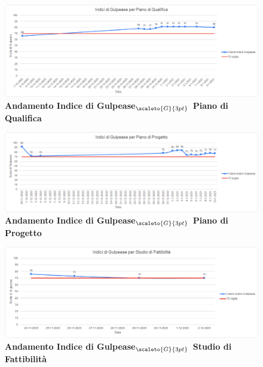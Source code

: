 {\begin{figure}[!h]
	\begin{center}
		\includegraphics[width=1\linewidth]{../immagini/IndexGulpeasePdQ.png}
		\caption{\textbf{Andamento Indice di Gulpease$_{\scaleto{G}{3pt}}$ Piano di Qualifica}}
	\end{center}
\end{figure}

\begin{figure}[!h]
	\begin{center}
		\includegraphics[width=1\linewidth]{../immagini/IndexGulpeasePdP.png}
		\caption{\textbf{Andamento Indice di Gulpease$_{\scaleto{G}{3pt}}$ Piano di Progetto}}
	\end{center}
\end{figure}

\begin{figure}[!h]
	\begin{center}
		\includegraphics[width=1\linewidth]{../immagini/IndexGulpeaseSdF.png}
		\caption{\textbf{Andamento Indice di Gulpease$_{\scaleto{G}{3pt}}$ Studio di Fattibilità}}
	\end{center}
\end{figure}
\clearpage

}
